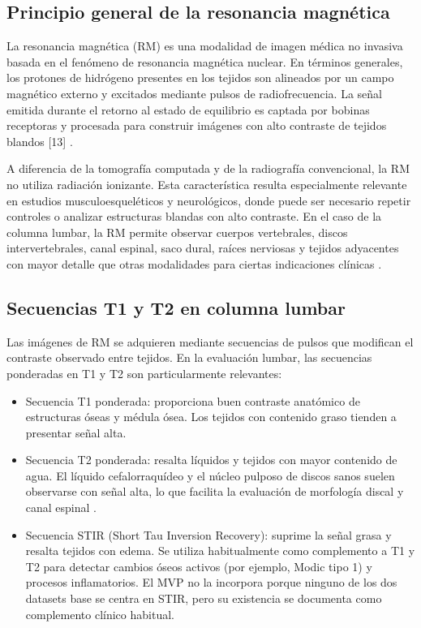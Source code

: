 \subsection{Principio general de la resonancia magnética}

La resonancia magnética (RM) es una modalidad de imagen médica no invasiva basada en el fenómeno de resonancia magnética nuclear. En términos generales, los protones de hidrógeno presentes en los tejidos son alineados por un campo magnético externo y excitados mediante pulsos de radiofrecuencia. La señal emitida durante el retorno al estado de equilibrio es captada por bobinas receptoras y procesada para construir imágenes con alto contraste de tejidos blandos [13] \parencite{mcrobbie_mri_2017}.

A diferencia de la tomografía computada y de la radiografía convencional, la RM no utiliza radiación ionizante. Esta característica resulta especialmente relevante en estudios musculoesqueléticos y neurológicos, donde puede ser necesario repetir controles o analizar estructuras blandas con alto contraste. En el caso de la columna lumbar, la RM permite observar cuerpos vertebrales, discos intervertebrales, canal espinal, saco dural, raíces nerviosas y tejidos adyacentes con mayor detalle que otras modalidades para ciertas indicaciones clínicas \parencite{modic_disk_1988,jarvik_deyo_low_back_pain_2002}.

\subsection{Secuencias T1 y T2 en columna lumbar}

Las imágenes de RM se adquieren mediante secuencias de pulsos que modifican el contraste observado entre tejidos. En la evaluación lumbar, las secuencias ponderadas en T1 y T2 son particularmente relevantes:

\begin{itemize}
  \item Secuencia T1 ponderada: proporciona buen contraste anatómico de estructuras óseas y médula ósea. Los tejidos con contenido graso tienden a presentar señal alta.
  \item Secuencia T2 ponderada: resalta líquidos y tejidos con mayor contenido de agua. El líquido cefalorraquídeo y el núcleo pulposo de discos sanos suelen observarse con señal alta, lo que facilita la evaluación de morfología discal y canal espinal \parencite{modic_disk_1988}.
  \item Secuencia STIR (Short Tau Inversion Recovery): suprime la señal grasa y resalta tejidos con edema. Se utiliza habitualmente como complemento a T1 y T2 para detectar cambios óseos activos (por ejemplo, Modic tipo 1) y procesos inflamatorios. El MVP no la incorpora porque ninguno de los dos datasets base se centra en STIR, pero su existencia se documenta como complemento clínico habitual.
\end{itemize}

